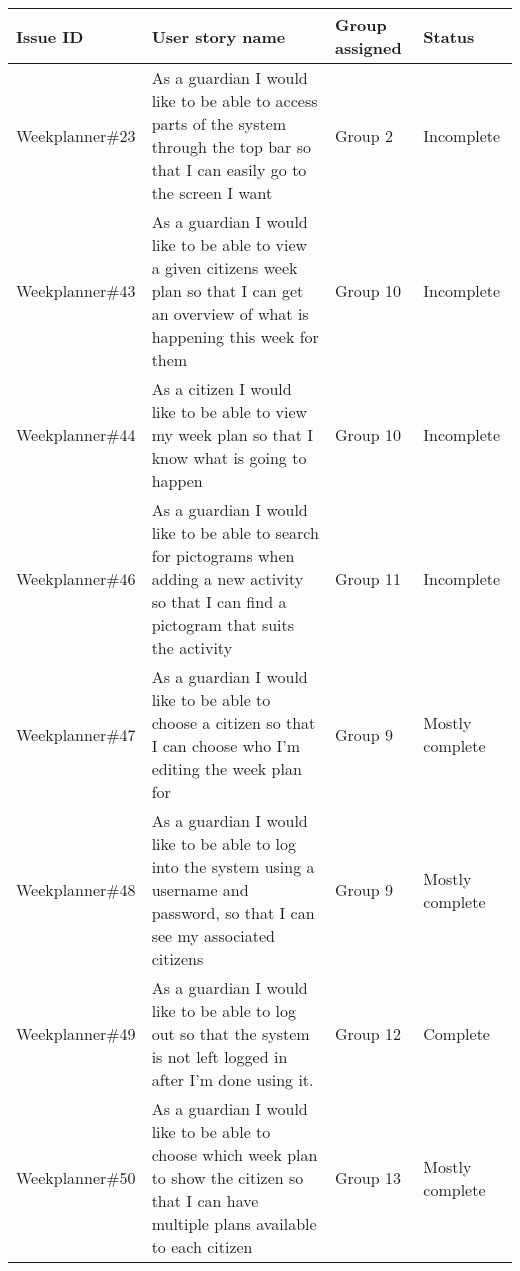 \begin{table}[H]
    \begin{tabular}{|p{2.8cm}|p{7cm}|p{1.6cm}|p{2cm}|}
    \hline
    Issue ID        & User story name                                                                                                                                                          & Group assigned  & Status     \\ \hline
    Weekplanner\#23 & As a guardian I would like to be able to access parts of the system through the top bar so that I can easily go to the screen I want                                     & Group 2         & Incomplete  \\ \hline
    Weekplanner\#43 & As a guardian I would like to be able to view a given citizens week plan so that I can get an overview of what is happening this week for them                           & Group 10        & Incomplete     \\ \hline
    Weekplanner\#44 & As a citizen I would like to be able to view my week plan so that I know what is going to happen                                                                         & Group 10        & Incomplete       \\ \hline
    Weekplanner\#46 & As a guardian I would like to be able to search for pictograms when adding a new activity so that I can find a pictogram that suits the activity                         & Group 11        & Incomplete      \\ \hline
    Weekplanner\#47 & As a guardian I would like to be able to choose a citizen so that I can choose who I’m editing the week plan for                                                         & Group 9         & Mostly complete    \\ \hline
    Weekplanner\#48 & As a guardian I would like to be able to log into the system using a username and password, so that I can see my associated citizens                                     & Group 9         & Mostly complete    \\ \hline
    Weekplanner\#49 & As a guardian I would like to be able to log out so that the system is not left logged in after I’m done using it.                                                       & Group 12        & Complete     \\ \hline
    Weekplanner\#50 & As a guardian I would like to be able to choose which week plan to show the citizen so that I can have multiple plans available to each citizen                          & Group 13        & Mostly complete     \\ \hline

\end{tabular}
\end{table}
